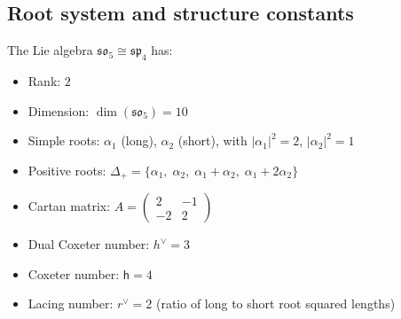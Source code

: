 \subsection{Root system and structure constants}

\begin{computation}\label{comp:B2-roots}
The Lie algebra $\mathfrak{so}_5 \cong \mathfrak{sp}_4$ has:
\begin{itemize}
\item Rank: $2$
\item Dimension: $\dim(\mathfrak{so}_5) = 10$
\item Simple roots: $\alpha_1$ (long), $\alpha_2$ (short), with
$|\alpha_1|^2 = 2$, $|\alpha_2|^2 = 1$
\item Positive roots: $\Delta_+ = \{\alpha_1,\; \alpha_2,\;
\alpha_1 + \alpha_2,\; \alpha_1 + 2\alpha_2\}$
\item Cartan matrix:
$A = \begin{pmatrix} 2 & -1 \\ -2 & 2 \end{pmatrix}$
\item Dual Coxeter number: $h^\vee = 3$
\item Coxeter number: $\mathsf{h} = 4$
\item Lacing number: $r^\vee = 2$ (ratio of long to short root squared lengths)
\end{itemize}
\end{computation}

